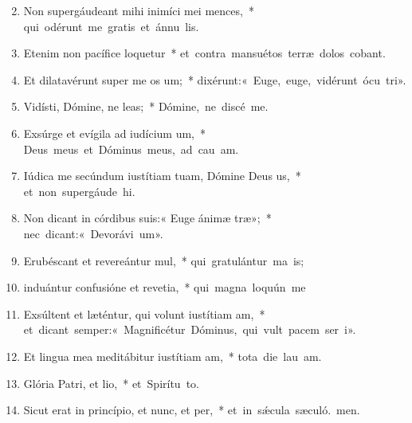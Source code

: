 \begin{flushleft}
\begin{enumerate}[leftmargin=*]
\setcounter{enumi}{1}

\item Non supergáudeant mihi inimíci mei mences,~* \mbox{qui odérunt me gratis et ánnu lis.}

\item Etenim non pacífice loquetur~* \mbox{et contra mansuétos terræ dolos cobant.}

\item Et dilatavérunt super me os um;~* \mbox{dixérunt:« Euge, euge, vidérunt ócu tri».}

\item Vidísti, Dómine, ne leas;~* \mbox{Dómine, ne discé  me.}

\item Exsúrge et evígila ad iudícium um,~* \mbox{Deus meus et Dóminus meus, ad cau am.}

\item Iúdica me secúndum iustítiam tuam, Dómine Deus us,~* \mbox{et non supergáude hi.}

\item Non dicant in córdibus suis:« Euge ánimæ træ»;~* \mbox{nec dicant:« Devorávi um».}

\item Erubéscant et revereántur mul,~* \mbox{qui gratulántur ma is;}

\item induántur confusióne et revetia,~* \mbox{qui magna loquún  me}

\item Exsúltent et læténtur, qui volunt iustítiam am,~* \mbox{et dicant semper:« Magnificétur Dóminus, qui vult pacem ser i».}

\item Et lingua mea meditábitur iustítiam am,~* \mbox{tota die lau am.}

\item Glória Patri, et lio,~* \mbox{et Spirítu to.}

\item Sicut erat in princípio, et nunc, et per,~* \mbox{et in s\'{\ae}cula sæculó. men.}

\end{enumerate}
\end{flushleft}

